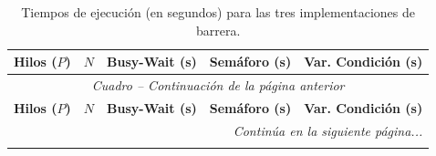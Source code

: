 \documentclass[11pt,a4paper]{article}
\begin{document}
\renewcommand{\arraystretch}{1.25}
\small
\begin{longtable}{ccrrr}
\caption{Tiempos de ejecución (en segundos) para las tres implementaciones de barrera.} \label{tab:resultados_barreras} \\
\hline
\textbf{Hilos ($P$)} & \textbf{$N$} & \textbf{Busy-Wait (s)} & \textbf{Semáforo (s)} & \textbf{Var. Condición (s)} \\ \hline
\endfirsthead

\multicolumn{5}{c}{\small \textit{Cuadro \thetable{} -- Continuación de la página anterior}} \\[0.5em]
\hline
\textbf{Hilos ($P$)} & \textbf{$N$} & \textbf{Busy-Wait (s)} & \textbf{Semáforo (s)} & \textbf{Var. Condición (s)} \\ \hline
\endhead

\hline
\multicolumn{5}{r}{\textit{Continúa en la siguiente página...}} \\
\endfoot

\hline
\endlastfoot


\end{longtable}
\end{document}
